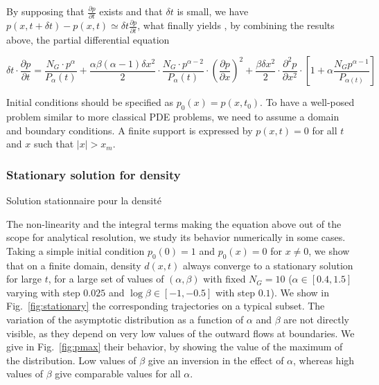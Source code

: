 By supposing that $\frac{\partial p}{\partial t}$ exists and that $\delta t$ is small, we have $p(x,t+\delta t) - p(x,t) \simeq \delta t\frac{\partial p}{\partial t}$, what finally yields , by combining the results above, the partial differential equation


\begin{equation}\label{eq:pde}
\delta t \cdot \frac{\partial p}{\partial t} = \frac{N_G \cdot p^{\alpha}}{P_{\alpha}(t)} + \frac{\alpha \beta (\alpha - 1) \delta x^2}{2}\cdot \frac{N_G \cdot p^{\alpha-2}}{P_{\alpha}(t)} \cdot \left(\frac{\partial p}{\partial x}\right)^2 + \frac{\beta \delta x^2}{2} \cdot \frac{\partial^2 p}{\partial x^2} \cdot\left[ 1 + \alpha \frac{N_G p^{\alpha - 1}}{P_{\alpha(t)}} \right]
\end{equation}



Initial conditions should be specified as $p_0(x) = p(x,t_0)$. To have a well-posed problem similar to more classical PDE problems, we need to assume a domain and boundary conditions. A finite support is expressed by $p(x,t)=0$ for all $t$ and $x$ such that $\left|x\right|>x_m$.



\subsubsection{Stationary solution for density}{Solution stationnaire pour la densité}

The non-linearity and the integral terms making the equation above out of the scope for analytical resolution, we study its behavior numerically in some cases. Taking a simple initial condition $p_0(0)=1$ and $p_0(x)=0$ for $x\neq 0$, we show that on a finite domain, density $d(x,t)$ always converge to a stationary solution for large $t$, for a large set of values of $(\alpha,\beta)$ with fixed $N_G=10$ ($\alpha\in \left[0.4,1.5\right]$ varying with step $0.025$ and $\log\beta \in \left[-1,-0.5\right]$ with step $0.1$). We show in Fig.~\ref{fig:stationary} the corresponding trajectories on a typical subset. The variation of the asymptotic distribution as a function of $\alpha$ and $\beta$ are not directly visible, as they depend on very low values of the outward flows at boundaries. We give in Fig.~\ref{fig:pmax} their behavior, by showing the value of the maximum of the distribution. Low values of $\beta$ give an inversion in the effect of $\alpha$, whereas high values of $\beta$ give comparable values for all $\alpha$.




